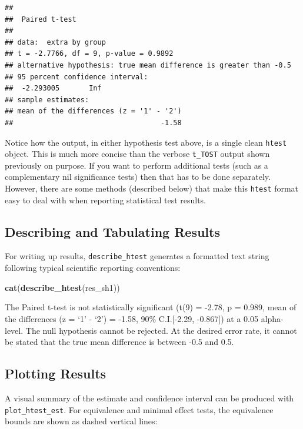 \documentclass[]{interact}
\theoremstyle{plain}%
\theoremstyle{definition}
\theoremstyle{remark}
\newenvironment{Shaded}{\begin{snugshade}}{\end{snugshade}}
\newcommand{\FunctionTok}[1]{\textcolor[rgb]{0.13,0.29,0.53}{\textbf{#1}}}
\newcommand{\NormalTok}[1]{#1}
\begin{document}
\begin{verbatim}
## 
##  Paired t-test
## 
## data:  extra by group
## t = -2.7766, df = 9, p-value = 0.9892
## alternative hypothesis: true mean difference is greater than -0.5
## 95 percent confidence interval:
##  -2.293005       Inf
## sample estimates:
## mean of the differences (z = '1' - '2') 
##                                   -1.58
\end{verbatim}

Notice how the output, in either hypothesis test above, is a single
clean \texttt{htest} object. This is much more concise than the verbose
\texttt{t\_TOST} output shown previously on purpose. If you want to
perform additional tests (such as a complementary nil significance
tests) then that has to be done separately. However, there are some
methods (described below) that make this \texttt{htest} format easy to
deal with when reporting statistical test results.

\subsection{Describing and Tabulating
Results}\label{describing-and-tabulating-results}

For writing up results, \texttt{describe\_htest} generates a formatted
text string following typical scientific reporting conventions:

\begin{Shaded}
\begin{Highlighting}[]
\FunctionTok{cat}\NormalTok{(}\FunctionTok{describe\_htest}\NormalTok{(res\_sh1))}
\end{Highlighting}
\end{Shaded}

The Paired t-test is not statistically significant (t(9) = -2.78, p =
0.989, mean of the differences (z = `1' - `2') = -1.58, 90\%
C.I.{[}-2.29, -0.867{]}) at a 0.05 alpha-level. The null hypothesis
cannot be rejected. At the desired error rate, it cannot be stated that
the true mean difference is between -0.5 and 0.5.

\subsection{Plotting Results}\label{plotting-results}

A visual summary of the estimate and confidence interval can be produced
with \texttt{plot\_htest\_est}. For equivalence and minimal effect
tests, the equivalence bounds are shown as dashed vertical lines:
\end{document}
